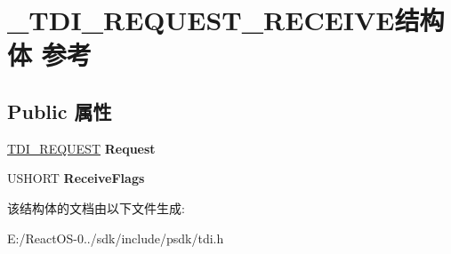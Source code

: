 \hypertarget{struct___t_d_i___r_e_q_u_e_s_t___r_e_c_e_i_v_e}{}\section{\+\_\+\+T\+D\+I\+\_\+\+R\+E\+Q\+U\+E\+S\+T\+\_\+\+R\+E\+C\+E\+I\+V\+E结构体 参考}
\label{struct___t_d_i___r_e_q_u_e_s_t___r_e_c_e_i_v_e}
\subsection*{Public 属性}
\begin{DoxyCompactItemize}
\item 
\mbox{\label{struct___t_d_i___r_e_q_u_e_s_t___r_e_c_e_i_v_e_a11a157e4768cdb13b3b6ee3ddea66d17}} 
\hyperlink{struct___t_d_i___r_e_q_u_e_s_t}{T\+D\+I\+\_\+\+R\+E\+Q\+U\+E\+ST} {\bfseries Request}
\item 
\mbox{\label{struct___t_d_i___r_e_q_u_e_s_t___r_e_c_e_i_v_e_a3052e497d7f6ce87ac86cd1b3b970e1a}} 
U\+S\+H\+O\+RT {\bfseries Receive\+Flags}
\end{DoxyCompactItemize}


该结构体的文档由以下文件生成\+:\begin{DoxyCompactItemize}
\item 
E\+:/\+React\+O\+S-\/0../sdk/include/psdk/tdi.\+h\end{DoxyCompactItemize}
